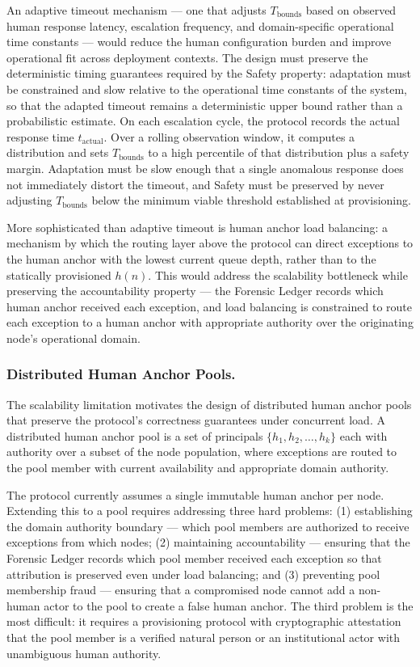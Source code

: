 An adaptive timeout mechanism --- one that adjusts $T_{\mathrm{bounds}}$ based on observed human response latency, escalation frequency, and domain-specific operational time constants --- would reduce the human configuration burden and improve operational fit across deployment contexts. The design must preserve the deterministic timing guarantees required by the Safety property: adaptation must be constrained and slow relative to the operational time constants of the system, so that the adapted timeout remains a deterministic upper bound rather than a probabilistic estimate. On each escalation cycle, the protocol records the actual response time $t_{\mathrm{actual}}$. Over a rolling observation window, it computes a distribution and sets $T_{\mathrm{bounds}}$ to a high percentile of that distribution plus a safety margin. Adaptation must be slow enough that a single anomalous response does not immediately distort the timeout, and Safety must be preserved by never adjusting $T_{\mathrm{bounds}}$ below the minimum viable threshold established at provisioning.

More sophisticated than adaptive timeout is human anchor load balancing: a mechanism by which the routing layer above the protocol can direct exceptions to the human anchor with the lowest current queue depth, rather than to the statically provisioned $h(n)$. This would address the scalability bottleneck while preserving the accountability property --- the Forensic Ledger records which human anchor received each exception, and load balancing is constrained to route each exception to a human anchor with appropriate authority over the originating node's operational domain.

\subsubsection{Distributed Human Anchor Pools.}
The scalability limitation motivates the design of distributed human anchor pools that preserve the protocol's correctness guarantees under concurrent load. A distributed human anchor pool is a set of principals $\{h_1, h_2, \ldots, h_k\}$ each with authority over a subset of the node population, where exceptions are routed to the pool member with current availability and appropriate domain authority.

The protocol currently assumes a single immutable human anchor per node. Extending this to a pool requires addressing three hard problems: (1) establishing the domain authority boundary --- which pool members are authorized to receive exceptions from which nodes; (2) maintaining accountability --- ensuring that the Forensic Ledger records which pool member received each exception so that attribution is preserved even under load balancing; and (3) preventing pool membership fraud --- ensuring that a compromised node cannot add a non-human actor to the pool to create a false human anchor. The third problem is the most difficult: it requires a provisioning protocol with cryptographic attestation that the pool member is a verified natural person or an institutional actor with unambiguous human authority.

